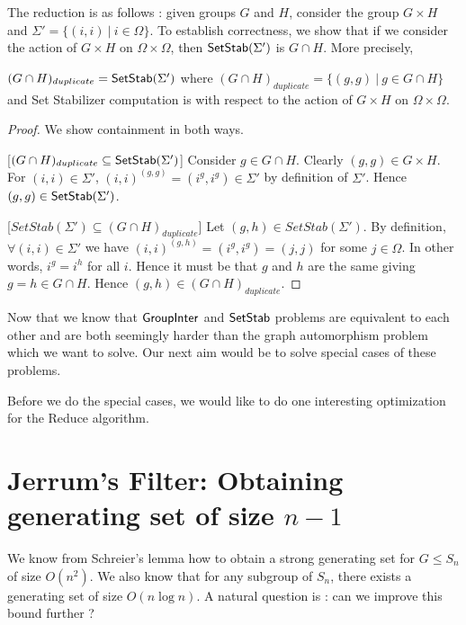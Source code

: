 The reduction is as follows : given groups $G$ and $H$, consider the group $G
\times H$  and $\Sigma'=\{ (i,i)~|~ i \in \Omega \}$. To establish correctness,
we show that if we consider the action of $G \times H$ on $\Omega \times
\Omega$, then ${\sf SetStab}(\Sigma')$ is $G \cap H$. More precisely,
\begin{claim}
$(G \cap H)_{duplicate} = {\sf SetStab}(\Sigma')$ where $(G \cap H)_{duplicate} = \{
(g,g) ~|~ g\in G \cap H \}$ and Set Stabilizer computation is with respect to
the action of $G \times H$ on $\Omega \times \Omega$.
\end{claim}
\begin{proof} We show containment in both ways.

	 [$(G \cap H)_{duplicate} \subseteq
	{\sf SetStab}(\Sigma')$] Consider $g \in G \cap H$.  Clearly
	$(g,g) \in G \times H$.  For $(i,i) \in \Sigma'$,
	$(i,i)^{(g,g)} = (i^g, i^g) \in \Sigma'$ by definition of
	$\Sigma'$. Hence $(g,g) \in {\sf SetStab}(\Sigma')$.
	
	[$SetStab(\Sigma') \subseteq (G \cap H)_{duplicate}$]
	Let $(g,h) \in SetStab(\Sigma')$. By definition, $\forall
	(i,i) \in \Sigma'$ we have $(i,i)^{(g,h)} = (i^g,i^g) =(j,j)$
	for some $j \in \Omega$. In other words, $i^g = i^h$ for all
	$i$. Hence it must be that $g$ and $h$ are the same giving 
	$g= h  \in G \cap H$. Hence $(g,h) \in (G \cap
	H)_{duplicate}$.
\end{proof}

Now that we know that ${\sf GroupInter}$ and ${\sf SetStab}$ problems are equivalent to each other and are both seemingly harder than the graph automorphism problem which we want to solve. Our next aim would be to solve special cases of these problems.

Before we do the special cases, we would like to do one interesting optimization for the {\sc Reduce} algorithm.

\section{Jerrum's Filter: Obtaining generating set of size $n-1$}


We know from Schreier's lemma how to obtain a strong generating set for $G \le
S_n$ of size $O(n^2)$. We also know that for any subgroup of $S_n$, there
exists a generating set of size $O(n\log n)$. A natural question is : can we
improve this bound further ?

